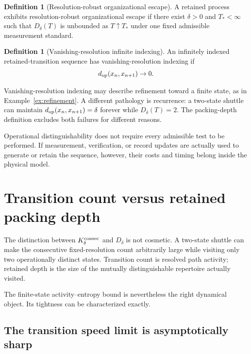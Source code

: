\documentclass[11pt,a4paper]{article}
\theoremstyle{definition}
\newtheorem{definition}[theorem]{Definition}
\numberwithin{equation}{section}
\begin{document}
\begin{definition}[Resolution-robust organizational escape]
A retained process exhibits resolution-robust organizational escape if there
exist $\delta>0$ and $T_*<\infty$ such that $D_\delta(T)$ is unbounded as
$T\uparrow T_*$ under one fixed admissible measurement standard.
\end{definition}

\begin{definition}[Vanishing-resolution infinite indexing]
An infinitely indexed retained-transition sequence has vanishing-resolution
indexing if
\[
d_{\rm op}(x_n,x_{n+1})\to0.
\]
\end{definition}

Vanishing-resolution indexing may describe refinement toward a finite state,
as in Example~\ref{ex:refinement}. A different pathology is recurrence:
a two-state shuttle can maintain
$d_{\rm op}(x_n,x_{n+1})=\delta$ forever while
$D_\delta(T)=2$. The packing-depth definition excludes both failures for
different reasons.

Operational distinguishability does not require every admissible
test to be performed. If measurement, verification, or record
updates are actually used to generate or retain the sequence,
however, their costs and timing belong inside the physical model.

\section{Transition count versus retained packing depth}
\label{sec:packing-depth}

The distinction between $K_\delta^{\rm consec}$ and $D_\delta$ is not
cosmetic. A two-state shuttle can make the consecutive fixed-resolution count
arbitrarily large while visiting only two operationally distinct states.
Transition count is resolved path activity; retained depth is the size of the
mutually distinguishable repertoire actually visited.

The finite-state activity--entropy bound is nevertheless the right dynamical
object. Its tightness can be characterized exactly.

\subsection*{The transition speed limit is asymptotically sharp}
\end{document}
